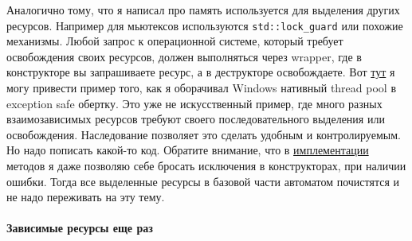 Аналогично тому, что я написал про память используется для выделения других ресурсов.
Например для мьютексов используются \verb"std::lock_guard" или похожие механизмы.
Любой запрос к операционной системе, который требует освобождения своих ресурсов, должен выполняться через wrapper, где в конструкторе вы запрашиваете ресурс, а в деструкторе освобождаете.
Вот \href{https://github.com/DimaTrushin/TypingAnalysisQt/blob/master/ThreadPool.h}{тут} я могу привести пример того, как я оборачивал Windows нативный thread pool в exception safe обертку.
Это уже не искусственный пример, где много разных взаимозависимых ресурсов требуют своего последовательного выделения или освобождения.
Наследование позволяет это сделать удобным и контролируемым.
Но надо пописать какой-то код.
Обратите внимание, что в \href{https://github.com/DimaTrushin/TypingAnalysisQt/blob/master/ThreadPool.cpp}{имплементации} методов я даже позволяю себе бросать исключения в конструкторах, при наличии ошибки.
Тогда все выделенные ресурсы в базовой части автоматом почистятся и не надо переживать на эту тему.

\paragraph{Зависимые ресурсы еще раз}

